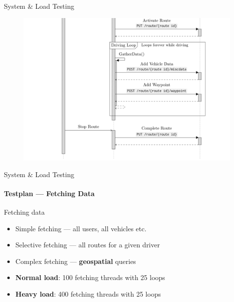\begin{frame}{System \& Load Testing}
{\begin{figure}[htb]
            \includegraphics[width=1\textwidth]{imgs/bottom_seq.png}
        \end{figure}
    }
\end{frame}


\begin{frame}{System \& Load Testing}
    \framesubtitle{Testplan --- Fetching Data}
    Fetching data
    \begin{itemize}
        \item Simple fetching --- all users, all vehicles etc.
        \item Selective fetching --- all routes for a given driver
        \item Complex fetching --- \textbf{geospatial} queries
        \item \textbf{Normal load}: 100 fetching threads with 25 loops
        \item \textbf{Heavy load}: 400 fetching threads with 25 loops
    \end{itemize}
\end{frame}
